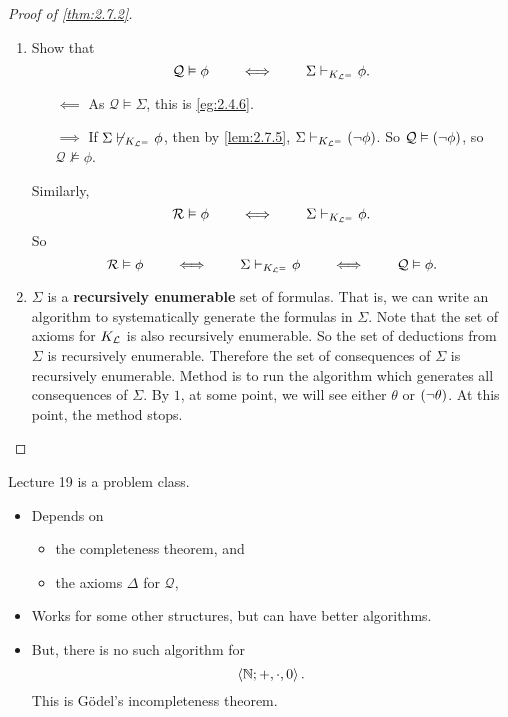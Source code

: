\begin{proof}[Proof of \ref{thm:2.7.2}]
\hfill
\begin{enumerate}
\item Show that
$$ \mathcal{Q} \vDash \phi \qquad \iff \qquad \Sigma \vdash_{K_{\mathcal{L}^=}} \phi. $$
\begin{itemize}
\item[$ \impliedby $] As $ \mathcal{Q} \vDash \Sigma $, this is \ref{eg:2.4.6}.
\item[$ \implies $] If $ \Sigma \not\vdash_{K_{\mathcal{L}^=}} \phi $, then by \ref{lem:2.7.5}, $ \Sigma \vdash_{K_{\mathcal{L}^=}} \left( \neg \phi \right) $. So $ \mathcal{Q} \vDash \left( \neg \phi \right) $, so $ \mathcal{Q} \not\vDash \phi $.
\end{itemize}
Similarly,
$$ \mathcal{R} \vDash \phi \qquad \iff \qquad \Sigma \vdash_{K_{\mathcal{L}^=}} \phi. $$
So
$$ \mathcal{R} \vDash \phi \qquad \iff \qquad \Sigma \vdash_{K_{\mathcal{L}^=}} \phi \qquad \iff \qquad \mathcal{Q} \vDash \phi. $$
\item $ \Sigma $ is a \textbf{recursively enumerable} set of formulas. That is, we can write an algorithm to systematically generate the formulas in $ \Sigma $. Note that the set of axioms for $ K_{\mathcal{L}} $ is also recursively enumerable. So the set of deductions from $ \Sigma $ is recursively enumerable. Therefore the set of consequences of $ \Sigma $ is recursively enumerable. Method is to run the algorithm which generates all consequences of $ \Sigma $. By $ 1 $, at some point, we will see either $ \theta $ or $ \left( \neg \theta \right) $. At this point, the method stops.
\end{enumerate}
\end{proof}


Lecture 19 is a problem class.


\begin{note}
\hfill
\begin{itemize}
\item Depends on
\begin{itemize}
\item the completeness theorem, and
\item the axioms $ \Delta $ for $ \mathcal{Q} $,
\end{itemize}
\item Works for some other structures, but can have better algorithms.
\item But, there is no such algorithm for
$$ \left\langle \mathbb{N}; +, \cdot, 0 \right\rangle. $$
This is G\"odel's incompleteness theorem.
\end{itemize}
\end{note}

